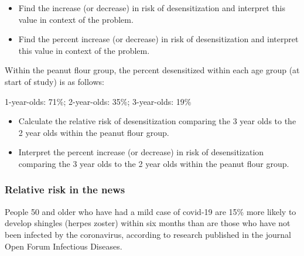 \documentclass[
]{report}
\providecommand{\tightlist}{%
  \setlength{\itemsep}{0pt}\setlength{\parskip}{0pt}}
\begin{document}
\vspace{0.6in}

\begin{itemize}
\tightlist
\item
  Find the increase (or decrease) in risk of desensitization and interpret this value in context of the problem.
\end{itemize}

\vspace{1in}

\begin{itemize}
\tightlist
\item
  Find the percent increase (or decrease) in risk of desensitization and interpret this value in context of the problem.
\end{itemize}

\vspace{1in}

Within the peanut flour group, the percent desensitized within each age group (at start of study) is as follows:

1-year-olds: 71\%; 2-year-olds: 35\%; 3-year-olds: 19\%

\begin{itemize}
\tightlist
\item
  Calculate the relative risk of desensitization comparing the 3 year olds to the 2 year olds within the peanut flour group.
\end{itemize}

\vspace{0.8in}

\begin{itemize}
\tightlist
\item
  Interpret the percent increase (or decrease) in risk of desensitization comparing the 3 year olds to the 2 year olds within the peanut flour group.
\end{itemize}

\vspace{0.8in}

\hypertarget{relative-risk-in-the-news}{%
\subsubsection*{Relative risk in the news}\label{relative-risk-in-the-news}}

People 50 and older who have had a mild case of covid-19 are 15\% more likely to develop shingles (herpes zoster) within six months than are those who have not been infected by the coronavirus, according to research published in the journal Open Forum Infectious Diseases.
\end{document}
